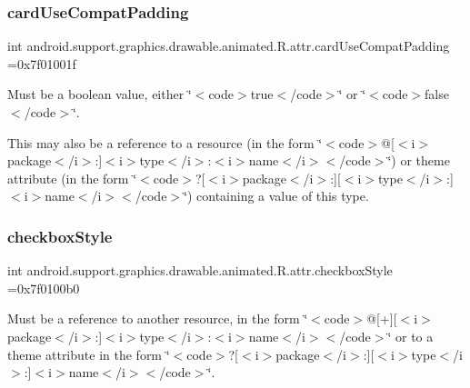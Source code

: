 \subsubsection{\texorpdfstring{card\+Use\+Compat\+Padding}{cardUseCompatPadding}}
{\footnotesize\ttfamily int android.\+support.\+graphics.\+drawable.\+animated.\+R.\+attr.\+card\+Use\+Compat\+Padding =0x7f01001f\hspace{0.3cm}{\ttfamily [static]}}

Must be a boolean value, either \char`\"{}$<$code$>$true$<$/code$>$\char`\"{} or \char`\"{}$<$code$>$false$<$/code$>$\char`\"{}. 

This may also be a reference to a resource (in the form \char`\"{}$<$code$>$@\mbox{[}$<$i$>$package$<$/i$>$\+:\mbox{]}$<$i$>$type$<$/i$>$\+:$<$i$>$name$<$/i$>$$<$/code$>$\char`\"{}) or theme attribute (in the form \char`\"{}$<$code$>$?\mbox{[}$<$i$>$package$<$/i$>$\+:\mbox{]}\mbox{[}$<$i$>$type$<$/i$>$\+:\mbox{]}$<$i$>$name$<$/i$>$$<$/code$>$\char`\"{}) containing a value of this type. \mbox{\label{classandroid_1_1support_1_1graphics_1_1drawable_1_1animated_1_1R_1_1attr_ab8fb810799cfc9a323ef0366a87bfdab}} 
\subsubsection{\texorpdfstring{checkbox\+Style}{checkboxStyle}}
{\footnotesize\ttfamily int android.\+support.\+graphics.\+drawable.\+animated.\+R.\+attr.\+checkbox\+Style =0x7f0100b0\hspace{0.3cm}{\ttfamily [static]}}

Must be a reference to another resource, in the form \char`\"{}$<$code$>$@\mbox{[}+\mbox{]}\mbox{[}$<$i$>$package$<$/i$>$\+:\mbox{]}$<$i$>$type$<$/i$>$\+:$<$i$>$name$<$/i$>$$<$/code$>$\char`\"{} or to a theme attribute in the form \char`\"{}$<$code$>$?\mbox{[}$<$i$>$package$<$/i$>$\+:\mbox{]}\mbox{[}$<$i$>$type$<$/i$>$\+:\mbox{]}$<$i$>$name$<$/i$>$$<$/code$>$\char`\"{}. \mbox{\label{classandroid_1_1support_1_1graphics_1_1drawable_1_1animated_1_1R_1_1attr_aec4465739d15e3c29a19c9c39eaa8952}} 
